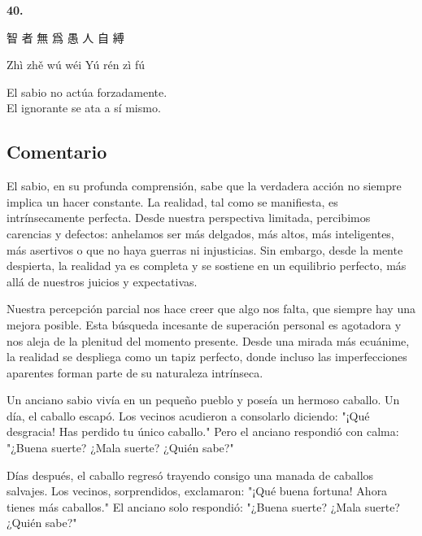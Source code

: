 \documentclass[
  a5paperpaper,
]{article}
\begin{document}
\hfill\break

\hypertarget{05}{}
\begin{verseblock}

\newpage

\begin{center}\textbf{40.}\end{center}

智 者 無 爲 愚 人 自 縛

Zhì zhě wú wéi Yú rén zì fú

El sabio no actúa forzadamente.\\
El ignorante se ata a sí mismo.

\end{verseblock}

\hfill\break

\hypertarget{comentario-39}{%
\subsection{Comentario}\label{comentario-39}}

El sabio, en su profunda comprensión, sabe que la verdadera acción no
siempre implica un hacer constante. La realidad, tal como se manifiesta,
es intrínsecamente perfecta. Desde nuestra perspectiva limitada,
percibimos carencias y defectos: anhelamos ser más delgados, más altos,
más inteligentes, más asertivos o que no haya guerras ni injusticias.
Sin embargo, desde la mente despierta, la realidad ya es completa y se
sostiene en un equilibrio perfecto, más allá de nuestros juicios y
expectativas.

Nuestra percepción parcial nos hace creer que algo nos falta, que
siempre hay una mejora posible. Esta búsqueda incesante de superación
personal es agotadora y nos aleja de la plenitud del momento presente.
Desde una mirada más ecuánime, la realidad se despliega como un tapiz
perfecto, donde incluso las imperfecciones aparentes forman parte de su
naturaleza intrínseca.

Un anciano sabio vivía en un pequeño pueblo y poseía un hermoso caballo.
Un día, el caballo escapó. Los vecinos acudieron a consolarlo diciendo:
"¡Qué desgracia! Has perdido tu único caballo." Pero el anciano
respondió con calma: "¿Buena suerte? ¿Mala suerte? ¿Quién sabe?"

Días después, el caballo regresó trayendo consigo una manada de caballos
salvajes. Los vecinos, sorprendidos, exclamaron: "¡Qué buena fortuna!
Ahora tienes más caballos." El anciano solo respondió: "¿Buena suerte?
¿Mala suerte? ¿Quién sabe?"
\end{document}
